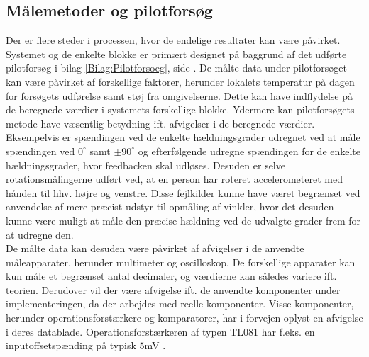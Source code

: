 \subsection{Målemetoder og pilotforsøg}
Der er flere steder i processen, hvor de endelige resultater kan være  påvirket. Systemet og de enkelte blokke er primært designet på baggrund af det udførte pilotforsøg i bilag \ref{Bilag:Pilotforsoeg}, side \pageref{Bilag:Pilotforsoeg}. De målte data under pilotforsøget kan være påvirket af forskellige faktorer, herunder lokalets temperatur på dagen for forsøgets udførelse samt støj fra omgivelserne. Dette kan have indflydelse på de beregnede værdier i systemets forskellige blokke.
Ydermere kan pilotforsøgets metode have væsentlig betydning ift. afvigelser i de beregnede værdier. Eksempelvis er spændingen ved de enkelte hældningsgrader udregnet ved at måle spændingen ved $0^{\circ}$ samt $\pm90^{\circ}$ og efterfølgende udregne spændingen for de enkelte hældningsgrader, hvor feedbacken skal udløses. Desuden er selve rotationsmålingerne udført ved, at en person har roteret accelerometeret med hånden til hhv. højre og venstre. Disse fejlkilder kunne have været begrænset ved anvendelse af mere præcist udstyr til opmåling af vinkler, hvor det desuden kunne være muligt at måle den præcise hældning ved de udvalgte grader frem for at udregne den.  \\
De målte data kan desuden være påvirket af afvigelser i de anvendte måleapparater, herunder multimeter og oscilloskop. De forskellige apparater kan kun måle et begrænset antal decimaler, og værdierne kan således variere ift. teorien. Derudover vil der være afvigelse ift. de anvendte komponenter under implementeringen, da der arbejdes med reelle komponenter. Visse komponenter, herunder operationsforstærkere og komparatorer, har i forvejen oplyst en afvigelse i deres datablade. Operationsforstærkeren af typen TL$081$ har f.eks. en inputoffsetspænding på typisk $5$mV \cite{Corporation1995}.

